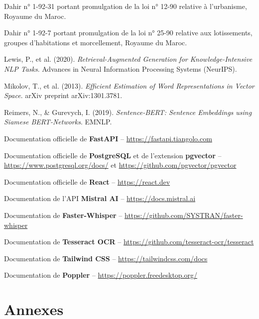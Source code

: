 \documentclass[12pt,a4paper]{report}
\begin{document}
\begin{enumerate}[label={[\arabic*]}]
    \item Dahir n° 1-92-31 portant promulgation de la loi n° 12-90 relative à l'urbanisme, Royaume du Maroc.
    \item Dahir n° 1-92-7 portant promulgation de la loi n° 25-90 relative aux lotissements, groupes d'habitations et morcellement, Royaume du Maroc.
    \item Lewis, P., et al. (2020). \textit{Retrieval-Augmented Generation for Knowledge-Intensive NLP Tasks}. Advances in Neural Information Processing Systems (NeurIPS).
    \item Mikolov, T., et al. (2013). \textit{Efficient Estimation of Word Representations in Vector Space}. arXiv preprint arXiv:1301.3781.
    \item Reimers, N., \& Gurevych, I. (2019). \textit{Sentence-BERT: Sentence Embeddings using Siamese BERT-Networks}. EMNLP.
    \item Documentation officielle de \textbf{FastAPI} -- \url{https://fastapi.tiangolo.com}
    \item Documentation officielle de \textbf{PostgreSQL} et de l'extension \textbf{pgvector} -- \url{https://www.postgresql.org/docs/} et \url{https://github.com/pgvector/pgvector}
    \item Documentation officielle de \textbf{React} -- \url{https://react.dev}
    \item Documentation de l'API \textbf{Mistral AI} -- \url{https://docs.mistral.ai}
    \item Documentation de \textbf{Faster-Whisper} -- \url{https://github.com/SYSTRAN/faster-whisper}
    \item Documentation de \textbf{Tesseract OCR} -- \url{https://github.com/tesseract-ocr/tesseract}
    \item Documentation de \textbf{Tailwind CSS} -- \url{https://tailwindcss.com/docs}
    \item Documentation de \textbf{Poppler} -- \url{https://poppler.freedesktop.org/}
\end{enumerate}

\appendix
\chapter{Annexes}
\end{document}
